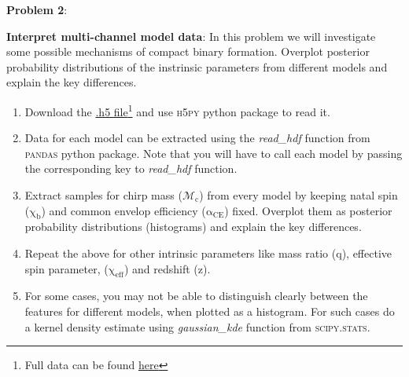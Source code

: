 \documentclass{article} %
\newcommand{\question}[2][]{\begin{flushleft}
        \textbf{Problem #1}: %
\end{flushleft}
}
\begin{document}
    \newpage
    
    \question[2]{} \textbf{Interpret multi-channel model data}: In this problem we will investigate some possible mechanisms of compact binary formation. Overplot posterior probability distributions of the instrinsic parameters from different models and explain the key differences.
    
    
    \begin{enumerate}
                \item Download the \href{https://drive.google.com/file/d/15zRrlW-Yby1k_wMhR8DXoVGxkWl-y5fZ/view?usp=sharing}{.h5 file}\footnote{Full data can be found \href{https://zenodo.org/record/4448170#.YmFY03_MKV4}{here}} and use \textsc{h5py} python package to read it. 
                \item Data for each model can be extracted using the \textit{read\_hdf} function from {\textsc{pandas}} python package. Note that you will have to call each model by passing the corresponding key to \textit{read\_hdf} function.
                \item Extract samples for chirp mass ($\mathrm{\mathcal{M}_c}$) from every model by keeping  natal spin ($\mathrm{\chi_b}$) and common envelop efficiency ($\mathrm{\alpha_{CE}}$) fixed. Overplot them as posterior probability distributions (histograms) and explain the key differences. 
                \item Repeat the above for other intrinsic parameters like mass ratio ($\mathrm{q}$), effective spin parameter, ($\mathrm{\chi_{eff}}$) and redshift ($\mathrm{z}$).
                \item For some cases, you may not be able to distinguish clearly between the features for different models, when plotted as a histogram. For such cases do a kernel density estimate  using \textit{gaussian\_kde} function from {\textsc{scipy.stats}}.
            \end{enumerate}
    
    
    
        
        
 

 
\end{document}
